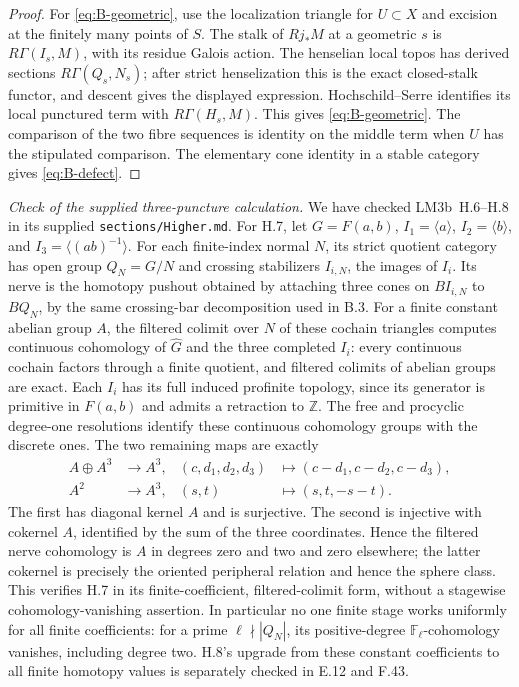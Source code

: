 \begin{proof}
For \eqref{eq:B-geometric}, use the localization triangle for $U\subset X$
and excision at the finitely many points of $S$. The stalk of
$Rj_*M$ at a geometric $s$ is $R\Gamma(I_s,M)$, with its residue
Galois action. The henselian local topos has derived sections
$R\Gamma(Q_s,N_s)$; after strict henselization this is the exact
closed-stalk functor, and descent gives the displayed expression.
Hochschild--Serre identifies its local punctured term with
$R\Gamma(H_s,M)$. This gives \eqref{eq:B-geometric}. The comparison
of the two fibre sequences is identity on the middle term when $U$
has the stipulated comparison. The elementary cone identity in a
stable category gives \eqref{eq:B-defect}.
\end{proof}

\medskip
\noindent\emph{Check of the supplied three-puncture calculation.}
We have checked LM3b~H.6--H.8 in its supplied
\texttt{sections/Higher.md}. For H.7, let
$G=F(a,b)$, $I_1=\langle a\rangle$,
$I_2=\langle b\rangle$, and
$I_3=\langle(ab)^{-1}\rangle$.
For each finite-index normal $N$, its strict quotient category has
open group $Q_N=G/N$ and crossing stabilizers $I_{i,N}$, the images
of $I_i$. Its nerve is the homotopy pushout obtained by attaching
three cones on $BI_{i,N}$ to $BQ_N$, by the same crossing-bar
decomposition used in B.3. For a finite constant abelian group $A$,
the filtered colimit over $N$ of these cochain triangles computes
continuous cohomology of $\widehat G$ and the three completed
$I_i$: every continuous cochain factors through a finite quotient,
and filtered colimits of abelian groups are exact. Each $I_i$
has its full induced profinite topology, since its generator is
primitive in $F(a,b)$ and admits a retraction to $\mathbb Z$.
The free and procyclic degree-one resolutions identify these
continuous cohomology groups with the discrete ones. The two
remaining maps are exactly
\[
 \begin{aligned}
 A\oplus A^3&\longrightarrow A^3,&
 (c,d_1,d_2,d_3)&\longmapsto(c-d_1,c-d_2,c-d_3),\\
 A^2&\longrightarrow A^3,&(s,t)&\longmapsto(s,t,-s-t).
 \end{aligned}
\]
The first has diagonal kernel $A$ and is surjective. The second
is injective with cokernel $A$, identified by the sum of the three
coordinates. Hence the filtered nerve cohomology is $A$ in degrees
zero and two and zero elsewhere; the latter cokernel is precisely
the oriented peripheral relation and hence the sphere class.
This verifies H.7 in its finite-coefficient, filtered-colimit form,
without a stagewise cohomology-vanishing assertion. In particular
no one finite stage works uniformly for all finite coefficients:
for a prime $\ell\nmid|Q_N|$, its positive-degree
$\mathbb F_\ell$-cohomology vanishes, including degree two.
H.8's upgrade from these constant coefficients to all finite
homotopy values is separately checked in E.12 and F.43.

